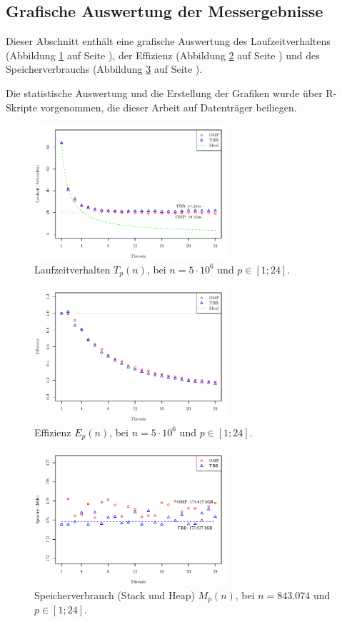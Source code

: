 \documentclass[11pt]{scrartcl}
\begin{document}
\subsection{Grafische Auswertung der Messergebnisse}

Dieser Abschnitt enthält eine grafische Auswertung des Laufzeitverhaltens (Abbildung \ref{s13_runtime} auf Seite \pageref{s13_runtime}), der Effizienz (Abbildung \ref{s13_efficiency} auf Seite \pageref{s13_efficiency}) und des Speicherverbrauchs (Abbildung \ref{s14_memory} auf Seite \pageref{s14_memory}).

Die statistische Auswertung und die Erstellung der Grafiken wurde über R-Skripte vorgenommen, die dieser Arbeit auf Datenträger beiliegen.

\begin{figure}[p]
\centering
\includegraphics[height=5cm]{../messdaten/s13_runtime.pdf}
\caption{Laufzeitverhalten $T_p(n)$, bei $n=5\cdot 10^6$ und $p \in [1;24]$.}
\label{s13_runtime}
\end{figure}

\begin{figure}[p]
\centering
\includegraphics[height=5cm]{../messdaten/s13_efficiency.pdf}
\caption{Effizienz $E_p(n)$, bei $n=5\cdot 10^6$ und $p \in [1;24]$.}
\label{s13_efficiency}
\end{figure}

\begin{figure}[p]
\centering
\includegraphics[height=5cm]{../messdaten/s14_memory.pdf}
\caption{Speicherverbrauch (Stack und Heap) $M_p(n)$, bei $n=843.074$ und $p \in [1;24]$.}
\label{s14_memory}
\end{figure}
\end{document}
